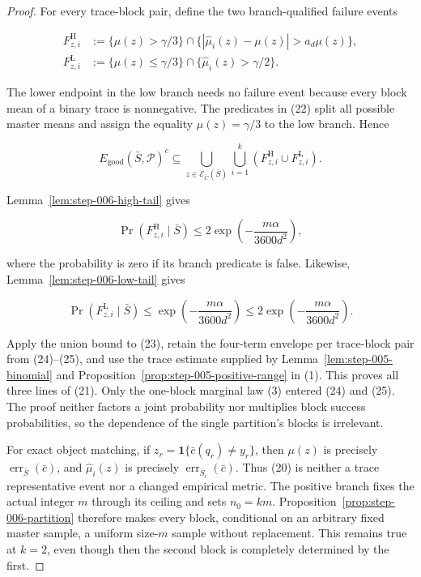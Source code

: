 \begin{proof}
For every trace-block pair, define the two branch-qualified
failure events

\[
\begin{aligned}
 F^{\mathrm H}_{z,i}
 &:=\{\mu(z)>\gamma/3\}
   \cap\{|\widehat\mu_i(z)-\mu(z)|>a_d\mu(z)\},\\
 F^{\mathrm L}_{z,i}
 &:=\{\mu(z)\leq\gamma/3\}
   \cap\{\widehat\mu_i(z)>\gamma/2\}.
\end{aligned}
\tag{22}
\]

The lower endpoint in the low branch needs no failure event because every
block mean of a binary trace is nonnegative.  The predicates in (22) split
all possible master means and assign the equality
\(\mu(z)=\gamma/3\) to the low branch.  Hence

\[
 E_{\mathrm{good}}(\bar S,\mathcal P)^c
 \subseteq
 \bigcup_{z\in\mathcal E_{\bar C}(\bar S)}
 \bigcup_{i=1}^k
 \left(F^{\mathrm H}_{z,i}\cup F^{\mathrm L}_{z,i}\right).
\tag{23}
\]

Lemma~\ref{lem:step-006-high-tail} gives

\[
 \Pr(F^{\mathrm H}_{z,i}\mid\bar S)
 \leq2\exp\!\left(-\frac{m\alpha}{3600d^2}\right),
\tag{24}
\]

where the probability is zero if its branch predicate is false.  Likewise,
Lemma~\ref{lem:step-006-low-tail} gives

\[
 \Pr(F^{\mathrm L}_{z,i}\mid\bar S)
 \leq\exp\!\left(-\frac{m\alpha}{3600d^2}\right)
 \leq2\exp\!\left(-\frac{m\alpha}{3600d^2}\right).
\tag{25}
\]

Apply the union bound to (23), retain the four-term envelope per
trace-block pair from (24)--(25), and use the trace estimate supplied by
Lemma~\ref{lem:step-005-binomial} and
Proposition~\ref{prop:step-005-positive-range} in (1).
This proves all three lines of (21).  Only the one-block marginal law (3)
entered (24) and (25).  The proof neither factors a joint probability nor
multiplies block success probabilities, so the dependence of the single
partition's blocks is irrelevant.

For exact object matching, if
\(z_r=\mathbf1\{\bar c(q_r)\ne y_r\}\), then \(\mu(z)\) is precisely
\(\operatorname{err}_{\bar S}(\bar c)\), and
\(\widehat\mu_i(z)\) is precisely
\(\operatorname{err}_{\bar S_i}(\bar c)\).  Thus (20) is neither a trace
representative event nor a changed empirical metric. 
The positive branch fixes the actual integer \(m\) through its ceiling and
sets \(n_0=km\).  Proposition~\ref{prop:step-006-partition} therefore makes
every block, conditional on an arbitrary fixed master sample, a uniform
size-\(m\) sample without replacement.  This remains true at \(k=2\), even
though then the second block is completely determined by the first.


\end{proof}
